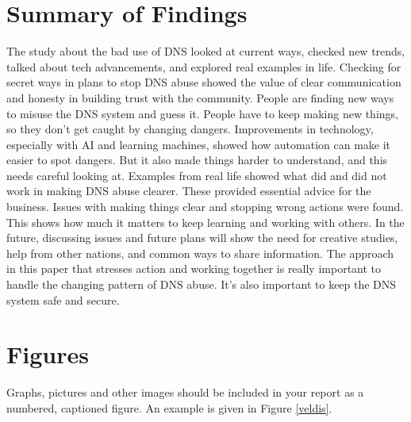 \section{Summary of Findings}

The study about the bad use of DNS looked at current ways, checked new trends, talked about tech advancements, and explored real examples in life. Checking for secret ways in plans to stop DNS abuse showed the value of clear communication and honesty in building trust with the community. People are finding new ways to misuse the DNS system and guess it. People have to keep making new things, so they don't get caught by changing dangers. Improvements in technology, especially with AI and learning machines, showed how automation can make it easier to spot dangers. But it also made things harder to understand, and this needs careful looking at. Examples from real life showed what did and did not work in making DNS abuse clearer. These provided essential advice for the business. Issues with making things clear and stopping wrong actions were found. This shows how much it matters to keep learning and working with others. In the future, discussing issues and future plans will show the need for creative studies, help from other nations, and common ways to share information. The approach in this paper that stresses action and working together is really important to handle the changing pattern of DNS abuse. It's also important to keep the DNS system safe and secure.



























\section{Figures}
Graphs, pictures and other images should be included in your report as a numbered, captioned figure. An example is given in Figure \ref{veldis}.

